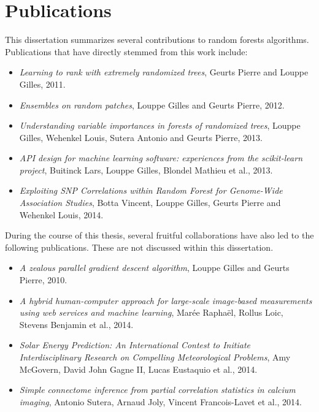 \section{Publications}

This dissertation summarizes several contributions to random forests
algorithms. Publications that have directly stemmed from this work include:

\begin{itemize}
\item \citep{geurts:2011} \textit{Learning to rank with extremely randomized trees}, Geurts Pierre and Louppe Gilles, 2011.

\item \citep{louppe:2012} \textit{Ensembles on random patches}, Louppe Gilles and Geurts Pierre, 2012.

\item \citep{louppe:2013} \textit{Understanding variable importances in forests of randomized trees}, Louppe Gilles, Wehenkel Louis, Sutera Antonio and Geurts Pierre, 2013.

\item \citep{buitinck:2013} \textit{API design for machine learning software: experiences from the scikit-learn project}, Buitinck Lars, Louppe Gilles, Blondel Mathieu et al., 2013.
\item \citep{botta:2014} \textit{Exploiting SNP Correlations within Random Forest for Genome-Wide Association Studies}, Botta Vincent, Louppe Gilles, Geurts Pierre and Wehenkel Louis, 2014.
\end{itemize}

During the course of this thesis, several fruitful collaborations have also
led to the following publications. These are not discussed within
this dissertation.

\begin{itemize}

\item \citep{louppe:2010} \textit{A zealous parallel gradient descent algorithm}, Louppe Gilles and Geurts Pierre, 2010.

\item \citep{maree:2014} \textit{A hybrid human-computer approach for large-scale image-based measurements using web services and machine learning}, Mar{\'e}e Rapha{\"e}l, Rollus Loic, Stevens Benjamin et al., 2014.

\item \citep{amy:2014} \textit{Solar Energy Prediction: An International Contest to Initiate Interdisciplinary Research on Compelling Meteorological Problems}, Amy McGovern, David John Gagne II, Lucas Eustaquio et al., 2014.

\item \citep{sutera:2014} \textit{Simple connectome inference from partial correlation statistics in calcium imaging}, Antonio Sutera, Arnaud Joly, Vincent Francois-Lavet et al., 2014.

\end{itemize}

